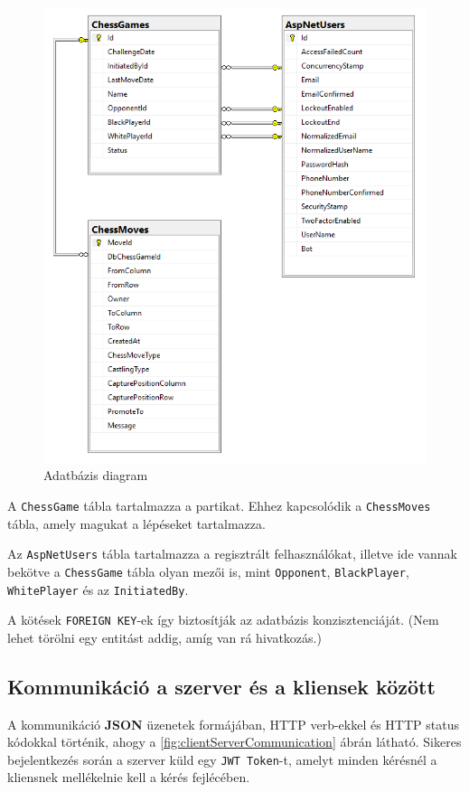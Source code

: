 \documentclass[twoside, a4paper, 12pt]{book}
\begin{document}
\begin{figure}[htbp]
	\centering
	\includegraphics[width=1.0\textwidth]{img/dbdiagram.png}
	\caption{Adatbázis diagram}
	\label{fig:dbdiagram}
\end{figure}

A \texttt{ChessGame} tábla tartalmazza a partikat. Ehhez kapcsolódik a \texttt{ChessMoves} tábla, amely magukat a lépéseket tartalmazza.

Az \texttt{AspNetUsers} tábla tartalmazza a regisztrált felhasználókat, illetve ide vannak bekötve a \texttt{ChessGame} tábla olyan mezői is, mint \texttt{Opponent}, \texttt{BlackPlayer}, \texttt{WhitePlayer} és az \texttt{InitiatedBy}.

A kötések \texttt{FOREIGN KEY}-ek így biztosítják az adatbázis konzisztenciáját. (Nem lehet törölni egy entitást addig, amíg van rá hivatkozás.)

\subsection{Kommunikáció a szerver és a kliensek között}
A kommunikáció \textbf{JSON} üzenetek formájában, HTTP verb-ekkel és HTTP status kódokkal történik, ahogy a \ref{fig:clientServerCommunication} ábrán látható. Sikeres bejelentkezés során a szerver küld egy \texttt{JWT Token}-t, amelyt minden kérésnél a kliensnek mellékelnie kell a kérés fejlécében.
\end{document}
